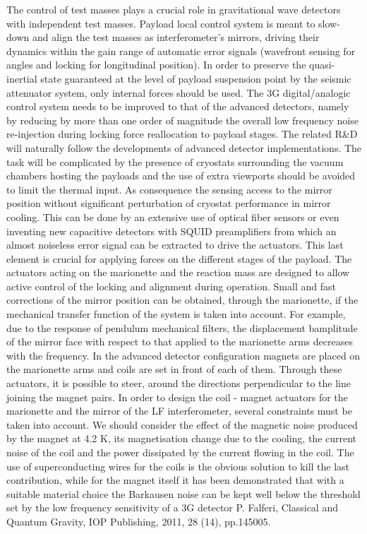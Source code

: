 The  control of test masses plays a crucial role in gravitational wave detectors with independent test masses. Payload local control system is meant to slow-down and align the test masses as interferometer’s mirrors, driving their dynamics within the gain range of automatic error signals (wavefront sensing for angles and locking for longitudinal position). In order to preserve the quasi-inertial state guaranteed at the level of payload suspension point by the seismic attenuator system, only internal forces should be used. The 3G digital/analogic control system needs to be improved to that of the advanced detectors, namely by reducing by more than one order of magnitude the overall low frequency noise re-injection during locking force reallocation to payload stages. The related R\&D will naturally follow the developments of advanced detector implementations. The task will be complicated by the presence of cryostats surrounding the vacuum chambers hosting the payloads and the use of extra viewports  should be avoided to limit the thermal input. 
As consequence the sensing access to the mirror position without significant perturbation of cryostat performance in mirror cooling. This can be done by an extensive use of optical fiber sensors or even inventing new capacitive  detectors with  SQUID preamplifiers from which an almost noiseless error signal can be extracted to drive the actuators. This last element is crucial for applying forces on the different  stages of the payload. The actuators acting on the marionette and the reaction mass are designed to allow active control of the locking and alignment during operation.
Small and fast corrections of the mirror position can be obtained, through the marionette, if the mechanical transfer function of the system is taken into account. For example, due to the response of pendulum mechanical filters, the displacement bamplitude of the mirror face with respect to that applied to the marionette arms decreases with the frequency.
In the advanced detector configuration  magnets are placed on the marionette arms and coils  are set in front of each of them. Through these actuators, it is possible to steer, around the directions perpendicular  to the line  joining the magnet pairs. In order to design the coil - magnet actuators for the marionette and the mirror of the LF interferometer, several constraints must be taken into account.
We should consider the effect of the magnetic noise produced by the magnet at 4.2 K,  its magnetisation change due to the cooling, the current noise of the coil and the power dissipated by the current flowing in the coil. The use of superconducting wires for the coils is the obvious solution to kill the last contribution, while for the magnet itself it has been demonstrated that with a suitable material choice the Barkausen noise can be kept  well below the threshold set by the low frequency sensitivity of a 3G detector {\color{red} P. Falferi, Classical and Quantum Gravity, IOP Publishing, 2011, 28 (14), pp.145005}.

